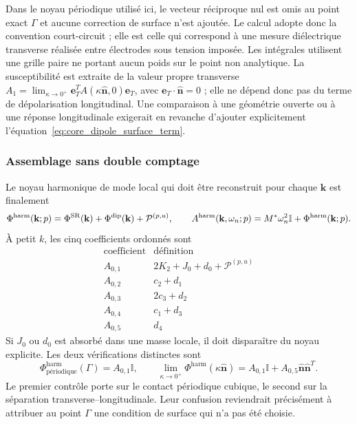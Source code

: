 Dans le noyau périodique utilisé ici, le vecteur réciproque nul est omis au
point exact $\Gamma$ et aucune correction de surface n'est ajoutée. Le calcul
adopte donc la convention court-circuit ; elle est celle qui correspond à une
mesure diélectrique transverse réalisée entre électrodes sous tension imposée.
Les intégrales utilisent une grille paire ne portant aucun poids sur le point
non analytique. La susceptibilité est extraite de la valeur propre transverse
$A_1=\lim_{\kappa\to0^+}
\mathbf e_T^T A(\kappa\widehat{\mathbf n},0)\mathbf e_T$, avec
$\mathbf e_T\!\cdot\!\widehat{\mathbf n}=0$ ; elle ne dépend donc pas du terme
de dépolarisation longitudinal. Une comparaison à une géométrie ouverte ou à
une réponse longitudinale exigerait en revanche d'ajouter explicitement
l'équation~\eqref{eq:core_dipole_surface_term}.

\subsubsection{Assemblage sans double comptage}

Le noyau harmonique de mode local qui doit être reconstruit pour chaque
$\mathbf k$ est finalement
\begin{equation}
\Phi^{\rm harm}(\mathbf k;p)
=\Phi^{\rm SR}(\mathbf k)+\Phi^{\rm dip}(\mathbf k)
+\mathcal P^{(p,u)},
\qquad
A^{\rm harm}(\mathbf k,\omega_n;p)
=M^*\omega_n^2\mathbb I+\Phi^{\rm harm}(\mathbf k;p).
\label{eq:core_harmonic_assembly}
\end{equation}
À petit $k$, les cinq coefficients ordonnés sont
\begin{equation}
\begin{array}{c|c}
\text{coefficient}&\text{définition}\\ \hline
A_{0,1}&2K_2+J_0+d_0+\mathcal P^{(p,u)}\\
A_{0,2}&c_2+d_1\\
A_{0,3}&2c_3+d_2\\
A_{0,4}&c_1+d_3\\
A_{0,5}&d_4
\end{array}
\label{eq:core_five_coefficients}
\end{equation}
Si $J_0$ ou $d_0$ est absorbé dans une masse locale, il doit disparaître du
noyau explicite. Les deux vérifications distinctes sont
\begin{equation}
\Phi^{\mathrm{harm}}_{\text{périodique}}(\Gamma)
=A_{0,1}\mathbb I,
\qquad
\lim_{\kappa\to0^+}
\Phi^{\mathrm{harm}}(\kappa\widehat{\mathbf n})
=A_{0,1}\mathbb I+A_{0,5}
\widehat{\mathbf n}\widehat{\mathbf n}^{T}.
\label{eq:core_contact_check}
\end{equation}
Le premier contrôle porte sur le contact périodique cubique, le second sur la
séparation transverse--longitudinale. Leur confusion reviendrait précisément à
attribuer au point $\Gamma$ une condition de surface qui n'a pas été choisie.

